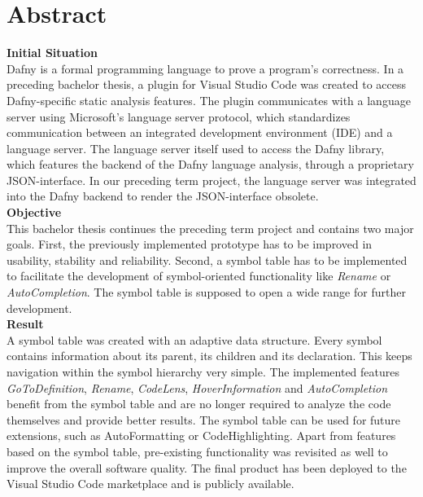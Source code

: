 \section{Abstract}
\label{section:abstract}

\textbf{Initial Situation}\\
Dafny is a formal programming language to prove a program's correctness.
In a preceding bachelor thesis, a plugin for Visual Studio Code was created to access Dafny-specific static analysis features.
The plugin communicates with a language server using Microsoft's language server protocol,
which standardizes communication between an integrated development environment (IDE) and a language server.
The language server itself used to access the Dafny library, which features the backend of the Dafny language analysis,
through a proprietary JSON-interface.
In our preceding term project, the language server was integrated into the Dafny backend to render the JSON-interface obsolete. \\

\textbf{Objective}\\
This bachelor thesis continues the preceding term project and contains two major goals.
First, the previously implemented prototype has to be improved in usability, stability and reliability.
Second, a symbol table has to be implemented to facilitate the development
of symbol-oriented functionality like \textit{Rename} or \textit{AutoCompletion}.
The symbol table is supposed to open a wide range for further development.\\

\textbf{Result}\\
A symbol table was created with an adaptive data structure.
Every symbol contains information about its parent, its children and its declaration.
This keeps navigation within the symbol hierarchy very simple.
The implemented features \textit{GoToDefinition}, \textit{Rename}, \textit{CodeLens}, \textit{HoverInformation} and \textit{AutoCompletion} benefit from the symbol table and are no longer required to analyze the code themselves and provide better results.
The symbol table can be used for future extensions, such as AutoFormatting or CodeHighlighting.
Apart from features based on the symbol table, pre-existing functionality was revisited as well to improve the overall software quality.
The final product has been deployed to the Visual Studio Code marketplace and is publicly available.
